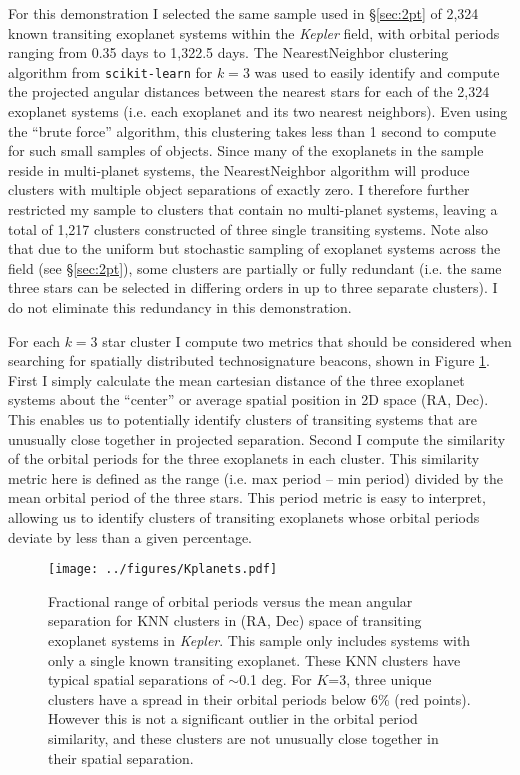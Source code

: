\documentclass[twocolumn]{aastex62}
\newcommand{\Kepler}{\textsl{Kepler}\xspace}
\begin{document}
For this demonstration I selected the same sample used in \S\ref{sec:2pt} of 2,324 known transiting exoplanet systems within the \Kepler field, with orbital periods ranging from 0.35 days to 1,322.5 days. 
The NearestNeighbor clustering algorithm from {\tt scikit-learn} for $k=3$ was used to easily identify and compute the projected angular distances between the nearest stars for each of the 2,324 exoplanet systems (i.e. each exoplanet and its two nearest neighbors). Even using the ``brute force'' algorithm, this clustering takes less than 1 second to compute for such small samples of objects. Since many of the exoplanets in the sample reside in multi-planet systems, the NearestNeighbor algorithm will produce clusters with multiple object separations of exactly zero. I therefore further restricted my sample to clusters that contain no multi-planet systems, leaving a total of 1,217 clusters constructed of three single transiting systems. Note also that due to the uniform but stochastic sampling of exoplanet systems across the field (see \S\ref{sec:2pt}), some clusters are partially or fully redundant (i.e. the same three stars can be selected in differing orders in up to three separate clusters). I do not eliminate this redundancy in this demonstration.

For each $k=3$ star cluster I compute two metrics that should be considered when searching for  spatially distributed technosignature beacons, shown in Figure \ref{fig:knn}. First I simply calculate the mean cartesian distance of the three exoplanet systems about the ``center'' or average spatial position in 2D space (RA, Dec). This enables us to potentially identify clusters of transiting systems that are unusually close together in projected separation. Second I compute the similarity of the orbital periods for the three exoplanets in each cluster. This similarity metric here is defined as the range (i.e. max period -- min period) divided by the mean orbital period of the three stars.
This period metric is easy to interpret, allowing us to identify clusters of transiting exoplanets whose orbital periods deviate by less than a given percentage.




\begin{figure}[!t]
\centering
\texttt{[image: ../figures/Kplanets.pdf]}
\caption{Fractional range of orbital periods versus the mean angular separation for KNN clusters in (RA, Dec) space of transiting exoplanet systems in \Kepler. This sample only includes systems with only a single known transiting exoplanet. These KNN clusters have typical spatial separations of $\sim$0.1 deg. For $K$=3, three unique clusters have a spread in their orbital periods below 6\% (red points). However this is not a significant outlier in the orbital period similarity, and these clusters are not unusually close together in their spatial separation.}
\label{fig:knn}
\end{figure}
\end{document}
